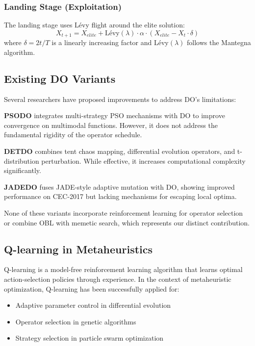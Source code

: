 \documentclass[preprint,12pt]{elsarticle}
\begin{document}
\subsubsection{Landing Stage (Exploitation)}
The landing stage uses Lévy flight around the elite solution:
\begin{equation}
X_{t+1} = X_{elite} + \text{Lévy}(\lambda) \cdot \alpha \cdot (X_{elite} - X_t \cdot \delta)
\label{eq:landing}
\end{equation}
where $\delta = 2t/T$ is a linearly increasing factor and $\text{Lévy}(\lambda)$ follows the Mantegna algorithm.

\subsection{Existing DO Variants}
\label{subsec:do_variants}

Several researchers have proposed improvements to address DO's limitations:

\textbf{PSODO} \cite{biomimetics2024} integrates multi-strategy PSO mechanisms with DO to improve convergence on multimodal functions. However, it does not address the fundamental rigidity of the operator schedule.

\textbf{DETDO} \cite{algorithms2025detdo} combines tent chaos mapping, differential evolution operators, and t-distribution perturbation. While effective, it increases computational complexity significantly.

\textbf{JADEDO} \cite{jadedo2025} fuses JADE-style adaptive mutation with DO, showing improved performance on CEC-2017 but lacking mechanisms for escaping local optima.

None of these variants incorporate reinforcement learning for operator selection or combine OBL with memetic search, which represents our distinct contribution.

\subsection{Q-learning in Metaheuristics}
\label{subsec:qlearning}

Q-learning \cite{watkins1992q} is a model-free reinforcement learning algorithm that learns optimal action-selection policies through experience. In the context of metaheuristic optimization, Q-learning has been successfully applied for:

\begin{itemize}
    \item Adaptive parameter control in differential evolution \cite{qde2018}
    \item Operator selection in genetic algorithms \cite{qga2019}
    \item Strategy selection in particle swarm optimization \cite{qpso2020}
\end{itemize}
\end{document}
